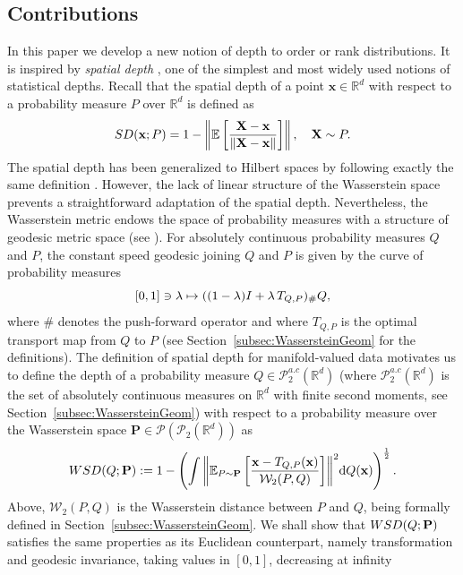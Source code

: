 \documentclass{imsart}
\numberwithin{equation}{section}
\def\R{\mathbb{R}}
\def\E{\mathbb{E}}
\def\x{\mathbf{x}}
\def\X{\mathbf{X}}
\def\E{\mathbb E}
\def\x{\mathbf x}
\begin{document}
\subsection{Contributions}
%
In this paper we develop a new notion of depth to order or rank distributions. It is inspired by  {\it spatial depth} \cite{vardi2000multivariate}, one of the simplest and most widely used notions of statistical depths.
Recall that the spatial depth of a point $\x\in \R^d$ with respect to a probability measure $ P$ over $\R^d$ is defined as 
\begin{equation}\label{conventional_spatial_depth}
	\rm SD(\x; P)=1-\left\|\E\left[\frac{\X-\x}{\|\X-\x\|}\right]\right\|, \quad \X\sim P.
\end{equation}
The spatial depth has been generalized to Hilbert spaces by following exactly the same definition \cite{serfling2002depth,virta2023spatial}. However, the lack of linear structure of the Wasserstein space prevents a straightforward adaptation of the spatial depth. Nevertheless, the Wasserstein metric endows the space of probability measures with a structure of geodesic  metric space (see \cite{AmbrosioGradient}).
For absolutely continuous probability measures $Q$ and $P$, the constant speed geodesic joining $Q$ and $P$ is given by the curve of probability measures 
$$ [0,1]\ni \lambda\mapsto   ((1-\lambda ){\rm I}+\lambda\, T_{Q,P})_{\# } Q, $$
where $\#$ denotes the push-forward operator
and where $T_{Q,P}$ is the optimal transport map from $Q$ to $P$
(see Section~\ref{subsec:WassersteinGeom} for the definitions). The definition of spatial depth for manifold-valued data 
motivates us to define the depth of a probability measure $Q\in \mathcal{P}^{a.c}_2(\R^d)$ (where $ \mathcal{P}^{a.c}_2(\R^d)$ is the set of absolutely continuous measures on $\R^d$ with finite second moments, see Section~\ref{subsec:WassersteinGeom})
with respect to a probability measure over the Wasserstein space  $ \mathbf{P}\in \mathcal{P}(\mathcal{P}_2(\R^d)) $
as
$$  {\rm WSD}(Q; {\bf P}):=1-  \left(\int{ \left\|\E_{P\sim \mathbf{P}}\left[  \frac{\x-T_{Q,P}(\x) }{\mathcal{W}_2(P,Q)}\right]\right\|^2} \mathrm{d}Q(\x)\right)^{\frac{1}{2}}. $$
Above, $\mathcal{W}_2(P,Q)$ is the Wasserstein distance between $P$ and $Q$, being formally defined in  Section~\ref{subsec:WassersteinGeom}.
We shall show that $ {\rm WSD}(Q; \mathbf{P})$ satisfies the same properties as its Euclidean counterpart, namely transformation and geodesic invariance, taking values in $[0,1]$, decreasing at infinity
\end{document}
